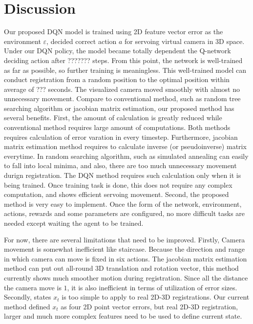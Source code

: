 \documentclass[10pt]{article}
\begin{document}
\section{Discussion}
 Our proposed DQN model is trained using 2D feature vector error as the environment $\varepsilon$, decided correct action $a$ for servoing virtual camera in 3D space. Under our DQN policy, the model became totally dependent the Q-network deciding action after ??????? steps. From this point, the network is well-trained as far as possible, so further training is meaningless. This well-trained model can conduct registration from a random position to the optimal position within average of ??? seconds. The visualized camera moved smoothly with almost no unnecessary movement. Compare to conventional method, such as random tree searching algorithm or jacobian matrix estimation, our proposed method has several benefits. First, the amount of calculation is greatly reduced while conventional method requires large amount of computations. Both methods requires calculation of error varation in every timestep. Furthermore, jacobian matrix estimation method requires to calculate inverse (or pseudoinverse) matrix everytime. In random searching algorithm, such as simulated annealing can easily to fall into local minima, and also, there are too much unnecessary movement durign registration. The DQN method requires such calculation only when it is being trained. Once training task is done, this does not require any complex computation, and shows efficient servoing movement. Second, the proposed method is very easy to implement. Once the form of the network, environment, actions, rewards and some parameters are configured, no more difficult tasks are needed except waiting the agent to be trained.

 For now, there are several limitations that need to be improved. Firstly, Camera movement is somewhat inefficient like staircase. Because the direction and range in which camera can move is fixed in six actions. The jacobian matrix estimation method can put out all-round 3D translation and rotation vector, this method currently shows much smoother motion during registration. Since all the distance the camera move is $1$, it is also inefficient in terms of utilization of error sizes. Secondly, states $x_t$ is too simple to apply to real 2D-3D registrations. Our current method defined $x_t$ as four 2D point vector errors, but real 2D-3D registration, larger and much more complex features need to be used to define current state.
\end{document}
